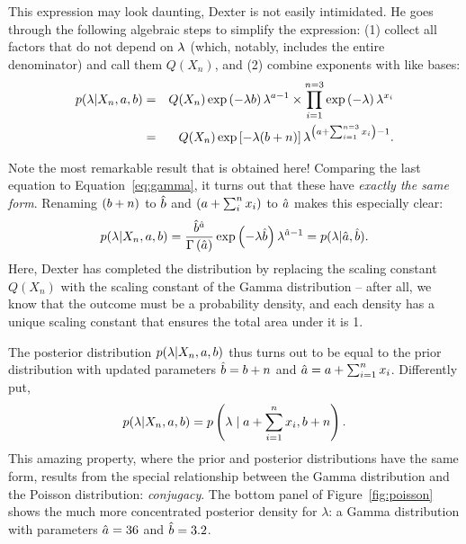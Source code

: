 This expression may look daunting, Dexter is not easily intimidated. He goes through the following algebraic steps to simplify the expression: (1) collect all factors that do not depend on $\lambda$ (which, notably, includes the entire denominator) and call them $Q(X_n)$, and (2) combine exponents with like bases:
\begin{eqnarray*}
  p(\lambda|X_n,a,b) &=& Q(X_n) \exp\left(-\lambda b\right) \lambda^{a - 1} 
                                 \times \prod_{i=1}^{n=3} \exp\left(-\lambda\right) \lambda^{x_i} \\
                             &=& Q(X_n) \exp\left[-\lambda(b + n)\right] \lambda^{\left(a + \sum_{i=1}^{n=3} x_i\right) - 1}.
\end{eqnarray*}

Note the most remarkable result that is obtained here! Comparing the last equation to Equation~\ref{eq:gamma}, it turns out that these have \emph{exactly the same form}.  Renaming $(b+n)$ to $\hat{b}$ and $\left(a + \sum_i^n x_i\right)$ to $\hat{a}$ makes this especially clear: $$p(\lambda|X_n,a,b) = \frac{\hat{b}^{\hat{a}}}{\Gamma\left(\hat{a}\right)} \exp\left(-\lambda\hat{b}\right) \lambda^{\hat{a} - 1} = p(\lambda|\hat{a},\hat{b}).$$ Here, Dexter has completed the distribution by replacing the scaling constant $Q(X_n)$ with the scaling constant of the Gamma distribution -- after all, we know that the outcome must be a probability density, and each density has a unique scaling constant that ensures the total area under it is 1.

The posterior distribution $p(\lambda|X_n, a, b)$ thus turns out to be equal to the prior distribution with updated parameters $\hat{b} = b + n$ and $\hat{a} = a + \sum_{i=1}^n x_i$.  Differently put, \begin{equation}p(\lambda|X_n,a,b) = p\left(\lambda\mid a + \sum_{i=1}^n x_i, b + n\right).\label{eq:gammapost}\end{equation} This amazing property, where the prior and posterior distributions have the same form, results from the special relationship between the Gamma distribution and the Poisson distribution: \emph{conjugacy}. The bottom panel of Figure~\ref{fig:poisson} shows the much more concentrated posterior density for $\lambda$: a Gamma distribution with parameters $\hat{a} = 36$ and $\hat{b} = 3.2$. 

